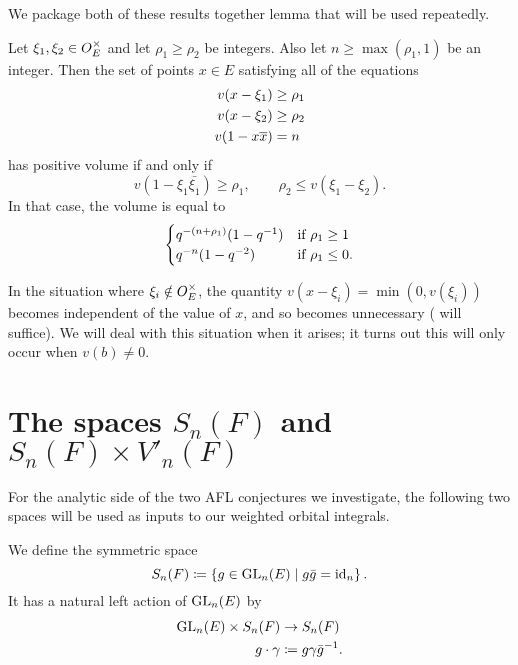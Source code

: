 We package both of these results together
lemma that will be used repeatedly.
\begin{lemma}
  \label{lem:quadruple_ineq}
  Let $\xi_1, \xi_2 \in O_E^\times$ and let $\rho_1 \ge \rho_2$ be integers.
  Also let $n \ge \max(\rho_1, 1)$ be an integer.
  Then the set of points $x \in E$ satisfying all of the equations
  \begin{align*}
    v(x - \xi_1) &\ge \rho_1 \\
    v(x - \xi_2) &\ge \rho_2 \\
    v(1 - x \overline x) &= n
  \end{align*}
  has positive volume if and only if
  \[ v(1 - \xi_1 \bar{\xi_1}) \ge \rho_1, \qquad \rho_2 \le v(\xi_1 - \xi_2). \]
  In that case, the volume is equal to
  \[
    \begin{cases}
      q^{-(n+\rho_1)}(1-q^{-1}) & \text{if } \rho_1 \ge 1 \\
      q^{-n}(1-q^{-2}) & \text{if } \rho_1 \le 0.
    \end{cases}
  \]
\end{lemma}
In the situation where $\xi_i \notin O_E^\times$,
the quantity $v(x-\xi_i) = \min(0, v(\xi_i))$
becomes independent of the value of $x$,
and so  becomes unnecessary
( will suffice).
We will deal with this situation when it arises;
it turns out this will only occur when $v(b) \neq 0$.

\section{The spaces $S_n(F)$ and $S_n(F) \times V'_n(F)$}
For the analytic side of the two AFL conjectures we investigate,
the following two spaces will be used as inputs to our weighted orbital integrals.
\begin{definition}
  We define the symmetric space
  \[ S_n(F) \coloneqq \left\{ g \in \operatorname{GL}_n(E) \mid g \bar g = \operatorname{id}_n \right\}. \]
  It has a natural left action of $\operatorname{GL}_n(E)$ by
  \begin{align*}
    \operatorname{GL}_n(E) \times S_n(F) &\to S_n(F) \\
    g \cdot \gamma &\coloneqq g \gamma \bar g^{-1}.
  \end{align*}
\end{definition}

